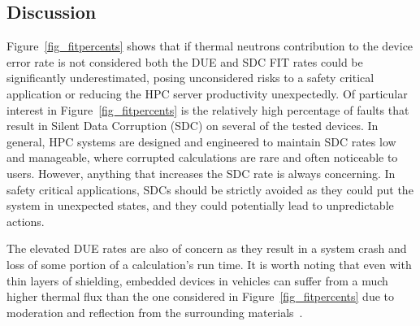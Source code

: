 \subsection{Discussion}


Figure~\ref{fig_fitpercents} shows that if thermal neutrons contribution to the device error rate is not considered both the DUE and SDC FIT rates could be significantly underestimated, posing unconsidered risks to a safety critical application or reducing the HPC server productivity unexpectedly. 
Of particular interest in Figure~\ref{fig_fitpercents} is the relatively high percentage of
faults that result in Silent Data Corruption (SDC) on several of the tested devices. In general, HPC systems are designed and engineered to maintain SDC rates low and manageable, where corrupted calculations are rare and often noticeable to users. However, anything that increases the SDC rate is always concerning. In safety critical applications, SDCs should be strictly avoided as they could put the system in unexpected states, and they could potentially lead to unpredictable actions.

The elevated DUE rates are also of concern as they result in a system crash and loss of some portion of a calculation's run time. 
It is worth noting that even with thin layers of shielding, embedded devices in vehicles can suffer from a much higher thermal flux than the one considered in Figure~\ref{fig_fitpercents} due to moderation and reflection from the surrounding materials~\cite{leo2012techniques}.


